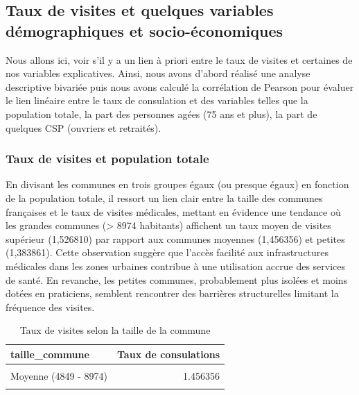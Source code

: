 \documentclass[
]{article}
\begin{document}
\hypertarget{taux-de-visites-et-quelques-variables-duxe9mographiques-et-socio-uxe9conomiques}{%
\subsection{Taux de visites et quelques variables démographiques et
socio-économiques}\label{taux-de-visites-et-quelques-variables-duxe9mographiques-et-socio-uxe9conomiques}}

Nous allons ici, voir s'il y a un lien à priori entre le taux de visites
et certaines de nos variables explicatives. Ainsi, nous avons d'abord
réalisé une analyse descriptive bivariée puis nous avons calculé la
corrélation de Pearson pour évaluer le lien linéaire entre le taux de
consulation et des variables telles que la population totale, la part
des personnes agées (75 ans et plus), la part de quelques CSP (ouvriers
et retraités).

\hypertarget{taux-de-visites-et-population-totale}{%
\subsubsection{Taux de visites et population
totale}\label{taux-de-visites-et-population-totale}}

En divisant les communes en trois groupes égaux (ou presque égaux) en
fonction de la population totale, il ressort un lien clair entre la
taille des communes françaises et le taux de visites médicales, mettant
en évidence une tendance où les grandes communes (\textgreater{} 8974
habitants) affichent un taux moyen de visites supérieur (1,526810) par
rapport aux communes moyennes (1,456356) et petites (1,383861). Cette
observation suggère que l'accès facilité aux infrastructures médicales
dans les zones urbaines contribue à une utilisation accrue des services
de santé. En revanche, les petites communes, probablement plus isolées
et moins dotées en praticiens, semblent rencontrer des barrières
structurelles limitant la fréquence des visites.

\begin{table}[H]
\centering
\caption{\label{tab:unnamed-chunk-8}Taux de visites selon la taille de la commune}
\centering
\begin{tabular}[t]{lr}
\toprule
taille\_commune & Taux de consulations\\
\midrule
\cellcolor{gray!10}{Grande (> 8974)} & \cellcolor{gray!10}{1.526810}\\
Moyenne (4849 - 8974) & 1.456356\\
\cellcolor{gray!10}{Petite (<= 4848)} & \cellcolor{gray!10}{1.383861}\\
\bottomrule
\end{tabular}
\end{table}
\end{document}
